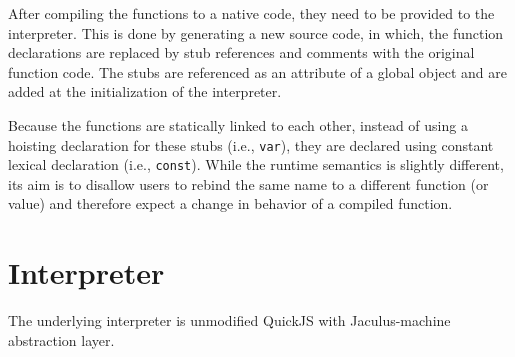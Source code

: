 After compiling the functions to a native code, they need to be provided to the interpreter. This is done by generating a new source code, in which, the function declarations are replaced by stub references and comments with the original function code. The stubs are referenced as an attribute of a global object and are added at the initialization of the interpreter.

Because the functions are statically linked to each other, instead of using a hoisting declaration for these stubs (i.e., \texttt{var}), they are declared using constant lexical declaration (i.e., \texttt{const}). While the runtime semantics is slightly different, its aim is to disallow users to rebind the same name to a different function (or value) and therefore expect a change in behavior of a compiled function.


\section{Interpreter}

The underlying interpreter is unmodified QuickJS with Jaculus-machine abstraction layer.
